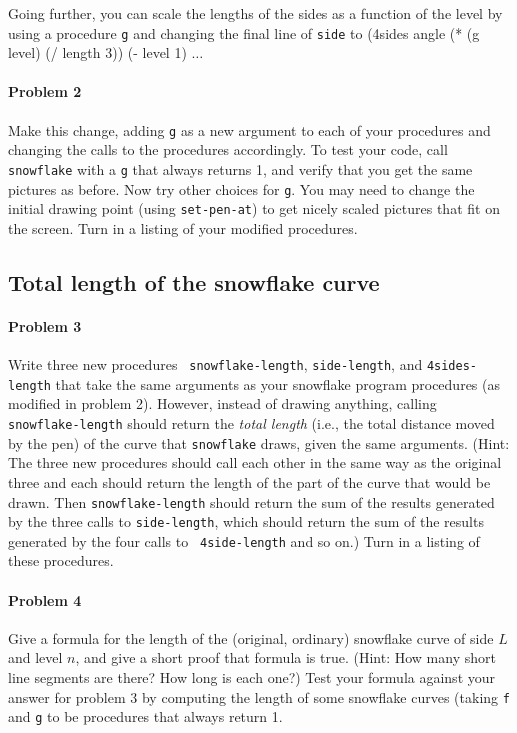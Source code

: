 Going further, you can scale the lengths of the sides as a function of
the level by using a procedure {\tt g} and changing the final line of
{\tt side} to
\beginlisp
(4sides angle (* (g level) (/ length 3)) (- level 1) $\ldots$
\endlisp

\paragraph{Problem 2} Make this change, adding {\tt g} as a new
argument to each of your procedures and changing the calls to the
procedures accordingly.  To test your code, call {\tt snowflake} with a
{\tt g} that always returns 1, and verify that you get the same
pictures as before.  Now try other choices for {\tt g}.  You may need
to change the initial drawing point (using {\tt set-pen-at}) to get
nicely scaled pictures that fit on the screen.  Turn in a listing of
your modified procedures.


\subsection{Total length of the snowflake curve}

\paragraph{Problem 3} Write three new procedures {\tt
snowflake-length}, {\tt side-length}, and {\tt 4sides-length} that take
the same arguments as your snowflake program procedures (as modified
in problem 2).  However, instead of drawing anything, calling {\tt
snowflake-length} should return the {\em total length} (i.e., the
total distance moved by the pen) of the curve that {\tt snowflake}
draws, given the same arguments. (Hint: The three new procedures
should call each other in the same way as the original three and each
should return the length of the part of the curve that would be drawn.
Then {\tt snowflake-length} should return the sum of the results
generated by the three calls to {\tt side-length}, which should return
the sum of the results generated by the four calls to {\tt
4side-length} and so on.)  Turn in a listing of these procedures.

\paragraph{Problem 4} Give a formula for the length of the (original,
ordinary) snowflake curve of side $L$ and level $n$, and give a short
proof that formula is true.  (Hint: How many short line segments are
there? How long is each one?)  Test your formula against your answer
for problem 3 by computing the length of some snowflake curves (taking
{\tt f} and {\tt g} to be procedures that always return 1.

